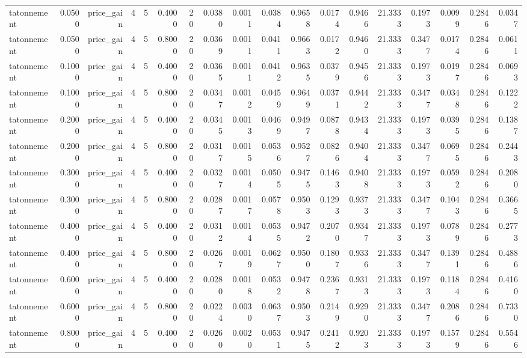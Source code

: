 \begin{table}[htbp]
\begin{tabular}{lrrrrrrrrrrrrrrrrr}
tatonnement & 0.0500 & price\_gain & 4 & 5 & 0.4000 & 20 & 0.0380 & 0.0011 & 0.0384 & 0.9658 & 0.0174 & 0.9466 & 21.3333 & 0.1973 & 0.0099 & 0.2846 & 0.0347 \\
tatonnement & 0.0500 & price\_gain & 4 & 5 & 0.8000 & 20 & 0.0369 & 0.0011 & 0.0411 & 0.9663 & 0.0172 & 0.9460 & 21.3333 & 0.3477 & 0.0174 & 0.2846 & 0.0611 \\
tatonnement & 0.1000 & price\_gain & 4 & 5 & 0.4000 & 20 & 0.0365 & 0.0011 & 0.0412 & 0.9635 & 0.0379 & 0.9456 & 21.3333 & 0.1973 & 0.0197 & 0.2846 & 0.0693 \\
tatonnement & 0.1000 & price\_gain & 4 & 5 & 0.8000 & 20 & 0.0347 & 0.0012 & 0.0459 & 0.9649 & 0.0371 & 0.9442 & 21.3333 & 0.3477 & 0.0348 & 0.2846 & 0.1222 \\
tatonnement & 0.2000 & price\_gain & 4 & 5 & 0.4000 & 20 & 0.0345 & 0.0013 & 0.0469 & 0.9497 & 0.0878 & 0.9434 & 21.3333 & 0.1973 & 0.0395 & 0.2846 & 0.1387 \\
tatonnement & 0.2000 & price\_gain & 4 & 5 & 0.8000 & 20 & 0.0317 & 0.0015 & 0.0536 & 0.9527 & 0.0826 & 0.9404 & 21.3333 & 0.3477 & 0.0695 & 0.2846 & 0.2443 \\
tatonnement & 0.3000 & price\_gain & 4 & 5 & 0.4000 & 20 & 0.0327 & 0.0014 & 0.0505 & 0.9475 & 0.1463 & 0.9408 & 21.3333 & 0.1973 & 0.0592 & 0.2846 & 0.2080 \\
tatonnement & 0.3000 & price\_gain & 4 & 5 & 0.8000 & 20 & 0.0287 & 0.0017 & 0.0578 & 0.9503 & 0.1293 & 0.9373 & 21.3333 & 0.3477 & 0.1043 & 0.2846 & 0.3665 \\
tatonnement & 0.4000 & price\_gain & 4 & 5 & 0.4000 & 20 & 0.0312 & 0.0014 & 0.0535 & 0.9472 & 0.2070 & 0.9347 & 21.3333 & 0.1973 & 0.0789 & 0.2846 & 0.2773 \\
tatonnement & 0.4000 & price\_gain & 4 & 5 & 0.8000 & 20 & 0.0267 & 0.0019 & 0.0627 & 0.9500 & 0.1807 & 0.9336 & 21.3333 & 0.3477 & 0.1391 & 0.2846 & 0.4886 \\
tatonnement & 0.6000 & price\_gain & 4 & 5 & 0.4000 & 20 & 0.0280 & 0.0018 & 0.0532 & 0.9478 & 0.2367 & 0.9313 & 21.3333 & 0.1973 & 0.1184 & 0.2846 & 0.4160 \\
tatonnement & 0.6000 & price\_gain & 4 & 5 & 0.8000 & 20 & 0.0224 & 0.0030 & 0.0637 & 0.9503 & 0.2149 & 0.9290 & 21.3333 & 0.3477 & 0.2086 & 0.2846 & 0.7330 \\
tatonnement & 0.8000 & price\_gain & 4 & 5 & 0.4000 & 20 & 0.0260 & 0.0020 & 0.0531 & 0.9475 & 0.2412 & 0.9203 & 21.3333 & 0.1973 & 0.1579 & 0.2846 & 0.5546 \\

\end{tabular}
\end{table}
